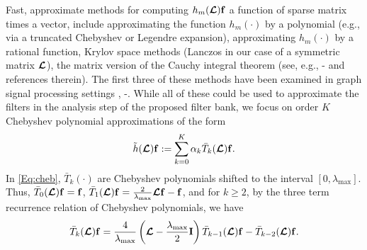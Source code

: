 \documentclass[journal, 10pt]{IEEEtran}
\begin{document}
Fast, approximate methods for computing $h_m(\boldsymbol{\mathcal{L}}){\bf f}$ a function of sparse matrix times a vector, include approximating the function $h_m(\cdot)$ by a polynomial (e.g., via a truncated Chebyshev or Legendre expansion), approximating $h_m(\cdot)$ by a rational function, Krylov space methods (Lanczos in our case of a symmetric matrix $\boldsymbol{\mathcal{L}}$), the matrix version of the Cauchy integral theorem (see, e.g., \cite{higham}\nocite{davies2005computing, frommer}-\cite{dubious} and references therein). The first three of these methods have been examined in graph signal processing settings \cite{hammond2011wavelets,PuyTGV15},  \cite{shuman_distributed_sipn}\nocite{susnjara, shi2015infinite}-\cite{loukas2015distributed}. While all of these could be used to approximate the filters in the analysis step of the proposed filter bank, we focus on order $K$ Chebyshev polynomial approximations of the form
\begin{align}\label{Eq:cheb}
\tilde{h}(\L){\bf f} := \sum_{k=0}^K \alpha_k \bar{T}_k(\L){\bf f}.
\end{align}
In \eqref{Eq:cheb}, $\bar{T}_k(\cdot)$ are Chebyshev polynomials shifted to the interval $[0,\lambda_{\max}]$. Thus,  $\bar{T}_0(\boldsymbol{\mathcal{L}}){\bf f} = {\bf f}$, $\bar{T}_1(\boldsymbol{\mathcal{L}}){\bf f} = \frac{2}{\lambda_{\max}}\boldsymbol{\mathcal{L}}{\bf f}-{\bf f}$, and for $k\geq 2$, by the three term recurrence relation of Chebyshev polynomials, we have
\begin{align}\label{Eq:Tkbar_rec}
\bar{T}_k(\L){\bf f} = \frac{4}{\lambda_{\max}}\left(\L-\frac{\lambda_{\max}}{2}{\bf I}\right)\bar{T}_{k-1}(\L){\bf f}-\bar{T}_{k-2}(\L){\bf f}.
\end{align}
\end{document}
